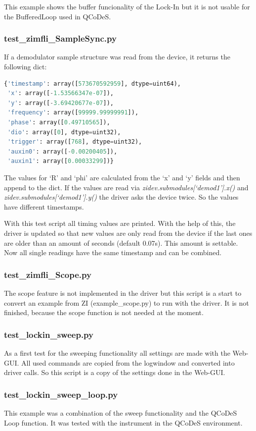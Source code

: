 \documentclass[11pt]{article} %
\begin{document}
This example shows the buffer funcionality of the Lock-In but it is not usable for the BufferedLoop used in QCoDeS.


\subsubsection{test\_zimfli\_SampleSync.py}
If a demodulator sample structure was read from the device, it returns the following dict:
\begin{lstlisting}[frame=single, language=Python, xleftmargin=1cm]
{'timestamp': array([573670592959], dtype=uint64),
 'x': array([-1.53566347e-07]),
 'y': array([-3.69420677e-07]),
 'frequency': array([99999.99999991]),
 'phase': array([0.49710565]),
 'dio': array([0], dtype=uint32),
 'trigger': array([768], dtype=uint32),
 'auxin0': array([-0.00200405]),
 'auxin1': array([0.00033299])}
\end{lstlisting}
The values for `R' and `phi' are calculated from the `x' and `y' fields and then append to the dict. If the values are read via {\it zidev.submodules[`demod1'].x()} and {\it zidev.submodules[`demod1'].y()} the driver asks the device twice. So the values have different timestamps.

With this test script all timing values are printed. With the help of this, the driver is updated so that new values are only read from the device if the last ones are older than an amount of seconds (default 0.07s). This amount is settable. Now all single readings have the same timestamp and can be combined.


\subsubsection{test\_zimfli\_Scope.py}
The scope feature is not implemented in the driver but this script is a start to convert an example from ZI (example\_scope.py) to run with the driver. It is not finished, because the scope function is not needed at the moment.


\subsubsection{test\_lockin\_sweep.py}
As a first test for the sweeping functionality all settings are made with the Web-GUI. All used commands are copied from the logwindow and converted into driver calls. So this script is a copy of the settings done in the Web-GUI.


\subsubsection{test\_lockin\_sweep\_loop.py}\label{lblsweepexam}
This example was a combination of the sweep functionality and the QCoDeS Loop function. It was tested with the instrument in the QCoDeS environment.
\end{document}
